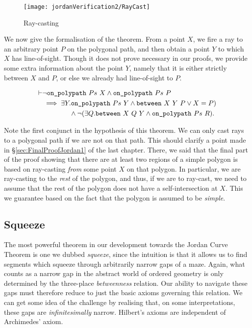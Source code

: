 \begin{figure}
\centering\texttt{[image: jordanVerification2/RayCast]}
\caption{Ray-casting}
\label{fig:RayCast}
\end{figure}

We now give the formalisation of the theorem. From a point $X$, we fire a ray to an arbitrary point $P$ on the polygonal path, and then obtain a point $Y$ to which $X$ has line-of-sight. Though it does not prove necessary in our proofs, we provide some extra information about the point $Y$, namely that it is either strictly between $X$ and $P$, or else we already had line-of-sight to $P$. 

\begin{equation}\label{eq:RayCast}
  \begin{aligned}
    \vdash&\neg\texttt{on\_polypath}\ Ps\ X \wedge \texttt{on\_polypath}\ Ps\ P\\
    &\implies \exists Y. \texttt{on\_polypath}\ Ps\ Y \wedge \texttt{between}\ X\ Y\ P \vee X = P)\\
    &\qquad\qquad \wedge \neg(\exists Q. \texttt{between}\ X\ Q\ Y \wedge \texttt{on\_polypath}\ Ps\ R).
  \end{aligned}
\end{equation}

Note the first conjunct in the hypothesis of this theorem. We can only cast rays to a polygonal path if we are not on that path. This should clarify a point made in \S\ref{sec:FinalProofJordan1} of the last chapter. There, we said that the final part of the proof showing that there are at least two regions of a simple polygon is based on ray-casting \emph{from} some point $X$ on that polygon. In particular, we are ray-casting to the \emph{rest} of the polygon, and thus, if we are to ray-cast, we need to assume that the rest of the polygon does not have a self-intersection at $X$. This we guarantee based on the fact that the polygon is assumed to be \emph{simple}.

\subsection{Squeeze}\label{sec:Squeeze}
The most powerful theorem in our development towards the Jordan Curve Theorem is one we dubbed \emph{squeeze}, since the intuition is that it allows us to find segments which squeeze through arbitrarily narrow gaps of a maze. Again, what counts as a narrow gap in the abstract world of ordered geometry is only determined by the three-place \emph{betweenness} relation. Our ability to navigate these gaps must therefore reduce to just the basic axioms governing this relation. We can get some idea of the challenge by realising that, on some interpretations, these gaps are \emph{infinitesimally} narrow. Hilbert's axioms are independent of Archimedes' axiom.

